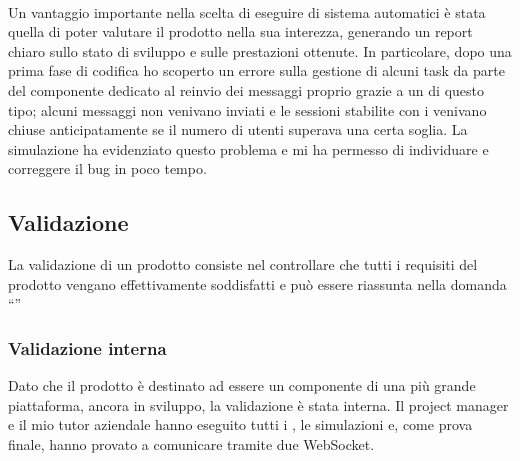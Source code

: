 		\paragraph*{}
		Un vantaggio importante nella scelta di eseguire  di sistema automatici è stata quella di poter valutare il prodotto nella sua interezza, generando un report chiaro sullo stato di sviluppo e sulle prestazioni ottenute. In particolare, dopo una prima fase di codifica ho scoperto un errore sulla gestione di alcuni task da parte del componente dedicato al reinvio dei messaggi proprio grazie a un  di questo tipo; alcuni messaggi non venivano inviati e le sessioni stabilite con i  venivano chiuse anticipatamente se il numero di utenti superava una certa soglia. La simulazione ha evidenziato questo problema e mi ha permesso di individuare e correggere il bug in poco tempo.

	\subsection{Validazione}
	La validazione di un prodotto consiste nel controllare che tutti i requisiti del prodotto vengano effettivamente soddisfatti e può essere riassunta nella domanda ``''
		\subsubsection{Validazione interna}
		Dato che il prodotto è destinato ad essere un componente di una più grande piattaforma, ancora in sviluppo, la validazione è stata interna. Il project manager e il mio tutor aziendale hanno eseguito tutti i , le simulazioni e, come prova finale, hanno provato a comunicare tramite due  WebSocket.
